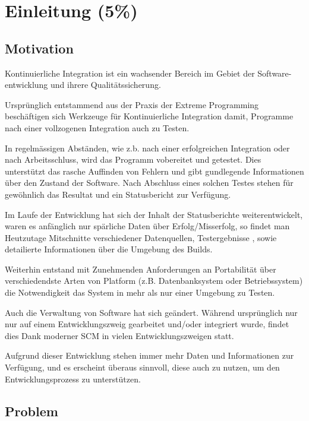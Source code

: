 \chapter{Einleitung (5\%) }

\section{Motivation}

Kontinuierliche Integration ist ein wachsender Bereich
im Gebiet der Software-entwicklung und ihrere Qualit\"atssicherung.

Urspr\"unglich entstammend aus der Praxis der Extreme Programming
\cite{xp:explained} \cite{folwer:xp}
besch\"aftigen sich Werkzeuge f\"ur Kontinuierliche Integration damit,
Programme nach einer vollzogenen Integration auch zu Testen.

In regelm\"assigen Abst\"anden, wie z.b. nach einer erfolgreichen Integration oder nach Arbeitsschluss,
wird das Programm vobereitet und getestet.
Dies unterst\"utzt das rasche Auffinden von Fehlern
und gibt gundlegende Informationen \"uber den Zustand der Software.
Nach Abschluss eines solchen Testes stehen f\"ur gew\"ohnlich das Resultat
und ein Statusbericht zur Verf\"ugung.

Im Laufe der Entwicklung hat sich der Inhalt der Statusberichte weiterentwickelt,
waren es anf\"anglich nur sp\"arliche Daten \"uber Erfolg/Misserfolg,
so findet man Heutzutage Mitschnitte verschiedener Datenquellen, Testergebnisse
\cite{jenkins:junitxml}, sowie detailierte Informationen \"uber die Umgebung des Builds.

Weiterhin entstand mit Zunehmenden Anforderungen an Portabilit\"at \"uber
verschiedendste Arten von Platform (z.B. Datenbanksystem oder Betriebssystem)
die Notwendigkeit das System in mehr als nur einer Umgebung zu Testen.

Auch die Verwaltung von Software hat sich ge\"andert.
W\"ahrend urspr\"unglich nur nur auf einem Entwicklungszweig gearbeitet und/oder integriert wurde,
findet dies Dank moderner SCM in vielen Entwicklungszweigen statt.
\cite{dvcs:vorteile} \cite{dvcs:entwicklungsmodelle}

Aufgrund dieser Entwicklung stehen immer mehr Daten und Informationen zur Verf\"ugung,
und es erscheint \"uberaus sinnvoll, diese auch zu nutzen, um den Entwicklungsprozess zu unterst\"utzen.



\section{Problem}

